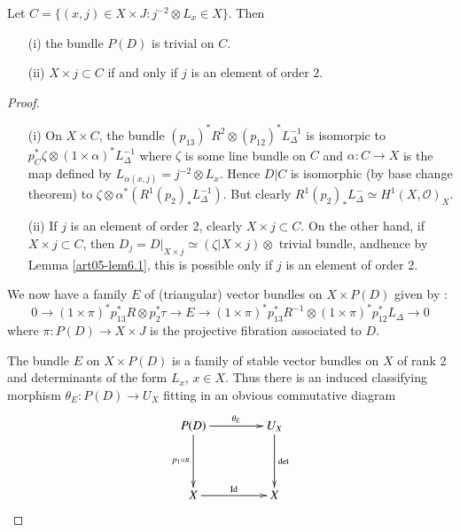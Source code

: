\setcounter{theorem}{2}
\begin{lemma}\label{art05-lem6.3}
Let $C=\{(x,j)\in X\times J:j^{-2}\otimes L_{x}\in X\}$. Then
\begin{itemize}
\item[\rm(i)] the bundle $P(D)$ is trivial on $C$.

\item[\rm(ii)] $X\times j\subset C$ if and only if $j$ is an element of order $2$. 
\end{itemize}
\end{lemma}

\begin{proof}
\begin{itemize}
\item[(i)] On $X\times C$, the bundle $(p_{13})^{*}R^{2}\otimes
(p_{12})^{*}L^{-1}_{\Delta}$ is isomorpic to $p^{*}_{C}\zeta\otimes
(1\times \alpha)^{*}L^{-1}_{\Delta}$ where $\zeta$ is some line bundle
on $C$ and $\alpha:C\to X$ is the map defined by
$L_{\alpha(x,j)}=j^{-2}\otimes L_{x}$. Hence $D|C$ is isomorphic (by
base change theorem) to
$\zeta\otimes \alpha^{*}(R^{1}(p_{2})_{*}L^{-1}_{\Delta})$. But clearly
$R^{1}(p_{2})_{*}L^{-}_{\Delta}\simeq H^{1}(X,\mathscr{O})_{X}$. 

\item[(ii)] If $j$ is an element of order 2, clearly $X\times j\subset
C$. On the other hand, if $X\times j\subset C$, then
$D_{j}=D|_{X\times j}\simeq (\zeta|X\times j)\otimes$ trivial bundle,
and\pageoriginale hence by Lemma \ref{art05-lem6.1}, this is possible
only if $j$ is an element of order 2.
\end{itemize}

We now have a family $E$ of (triangular) vector bundles on $X\times
P(D)$ given by \cite[Lemma 2,4]{art05-key6}:
\setcounter{equation}{3}
\begin{equation}
0\to (1\times \pi)^{*}p^{*}_{13}R\otimes p^{*}_{2}\tau \to E\to
(1\times\pi)^{*}p^{*}_{13}R^{-1}\otimes
(1\times\pi)^{*}p^{*}_{12}L_{\Delta}\to 0\label{art05-eq6.4}
\end{equation}
where $\pi:P(D)\to X\times J$ is the projective fibration associated
to $D$.

The bundle $E$ on $X\times P(D)$ is a family of stable vector
bundles \cite[Lemma 10.1 (i)]{art05-key3} on $X$ of rank 2 and
determinants of the form $L_{x}$, $x\in X$. Thus there is an induced
classifying morphism $\theta_{E}:P(D)\to U_{X}$ fitting in an obvious
commutative diagram
\begin{equation}
\vcenter{
\xymatrix@=1.5cm{
P(D)\ar[d]_-{p_{1}\circ \pi}\ar[r]^-{\theta_{E}} &
U_{X}\ar[d]^-{\det}\\
X \ar[r]^-{\text{Id}} & X
}}\label{art05-eq6.5}
\end{equation}


\end{proof}

